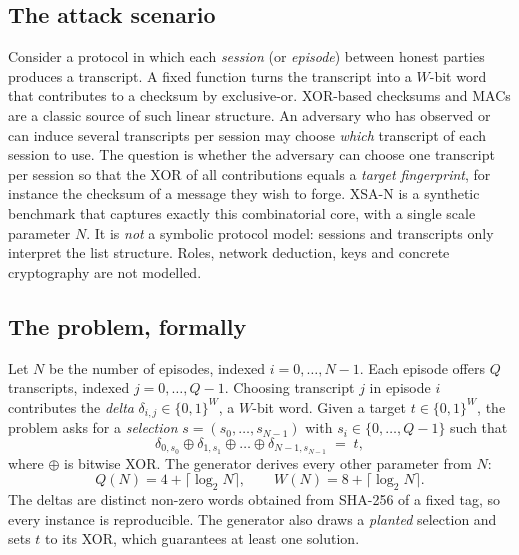 \documentclass[11pt,a4paper]{article}
\newcommand{\XSA}{\textsf{XSA-N}}
\begin{document}
\subsection{The attack scenario}
Consider a protocol in which each \emph{session} (or \emph{episode}) between honest parties
produces a transcript. A fixed function turns the transcript into a $W$-bit word that
contributes to a checksum by exclusive-or. XOR-based checksums and MACs are a classic source
of such linear structure. An adversary who has observed or can induce several transcripts
per session may choose \emph{which} transcript of each session to use. The question is
whether the adversary can choose one transcript per session so that the XOR of all
contributions equals a \emph{target fingerprint}, for instance the checksum of a message
they wish to forge. \XSA{} is a synthetic benchmark that captures exactly this combinatorial
core, with a single scale parameter $N$.
It is \emph{not} a symbolic protocol model: sessions and transcripts only interpret
the list structure. Roles, network deduction, keys and concrete cryptography are not modelled.

\subsection{The problem, formally}
\label{sec:xsa-formal}
Let $N$ be the number of episodes, indexed $i=0,\dots,N-1$. Each episode offers
$Q$ transcripts, indexed $j=0,\dots,Q-1$. Choosing transcript $j$ in episode $i$
contributes the \emph{delta} $\delta_{i,j}\in\{0,1\}^W$, a $W$-bit word. Given a target
$t\in\{0,1\}^W$, the problem asks for a \emph{selection} $s=(s_0,\dots,s_{N-1})$ with
$s_i\in\{0,\dots,Q-1\}$ such that
\begin{equation}
\delta_{0,s_0}\oplus\delta_{1,s_1}\oplus\dots\oplus\delta_{N-1,s_{N-1}} \;=\; t,
\label{eq:attack}
\end{equation}
where $\oplus$ is bitwise XOR. The generator derives every other parameter from $N$:
\begin{equation}
Q(N) = 4 + \lceil\log_2 N\rceil, \qquad W(N) = 8 + \lceil\log_2 N\rceil.
\label{eq:qw}
\end{equation}
The deltas are distinct non-zero words obtained from SHA-256 of a fixed tag, so every
instance is reproducible. The generator also draws a \emph{planted} selection and sets $t$
to its XOR, which guarantees at least one solution.
\end{document}
